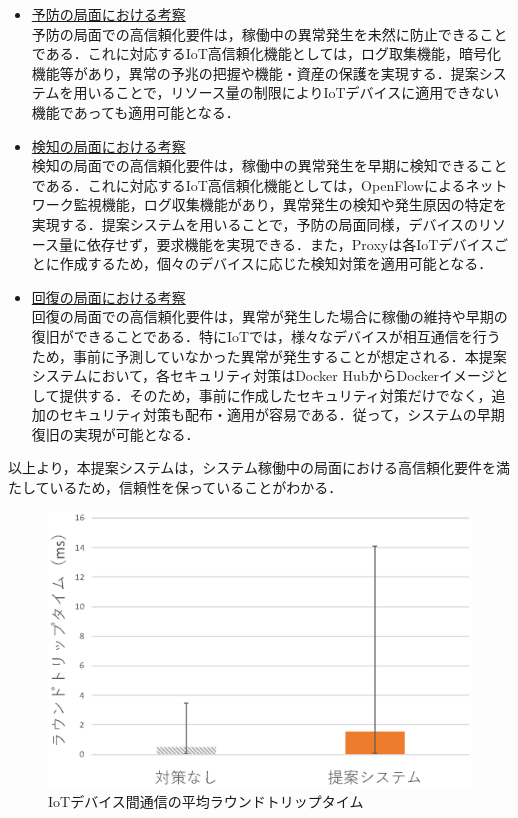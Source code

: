 \documentclass[Japanese]{dicomopapers}
\begin{document}
\begin{itemize}
	\item \underline{予防の局面における考察}\mbox{}\\
	      予防の局面での高信頼化要件は，稼働中の異常発生を未然に防止できることである．これに対応するIoT高信頼化機能としては，ログ取集機能，暗号化機能等があり，異常の予兆の把握や機能・資産の保護を実現する．提案システムを用いることで，リソース量の制限によりIoTデバイスに適用できない機能であっても適用可能となる．
	\item \underline{検知の局面における考察}\mbox{}\\
	      検知の局面での高信頼化要件は，稼働中の異常発生を早期に検知できることである．これに対応するIoT高信頼化機能としては，OpenFlowによるネットワーク監視機能，ログ収集機能があり，異常発生の検知や発生原因の特定を実現する．提案システムを用いることで，予防の局面同様，デバイスのリソース量に依存せず，要求機能を実現できる．また，Proxyは各IoTデバイスごとに作成するため，個々のデバイスに応じた検知対策を適用可能となる．
	\item \underline{回復の局面における考察}\mbox{}\\
	      回復の局面での高信頼化要件は，異常が発生した場合に稼働の維持や早期の復旧ができることである．特にIoTでは，様々なデバイスが相互通信を行うため，事前に予測していなかった異常が発生することが想定される．本提案システムにおいて，各セキュリティ対策はDocker HubからDockerイメージとして提供する．そのため，事前に作成したセキュリティ対策だけでなく，追加のセキュリティ対策も配布・適用が容易である．従って，システムの早期復旧の実現が可能となる．
\end{itemize}

以上より，本提案システムは，システム稼働中の局面における高信頼化要件を満たしているため，信頼性を保っていることがわかる．

\begin{figure}[!tb]
	\centering
	\includegraphics[width=\linewidth]{img/result.eps}
	\caption{IoTデバイス間通信の平均ラウンドトリップタイム}
	\label{fig:result2}
\end{figure}
\end{document}
